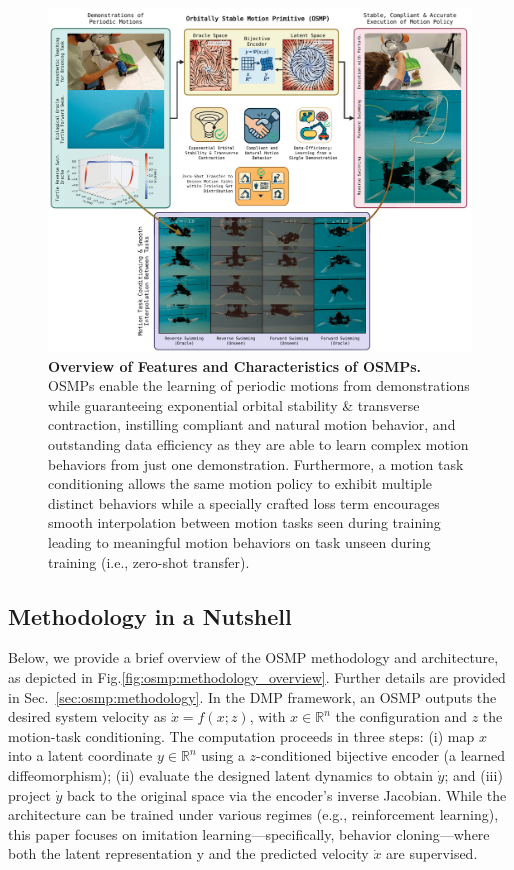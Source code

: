 \begin{figure}[h!]
    \centering
    \includegraphics[width=1.0\linewidth]{osmp/figures/concept_overview/concept_overview_v1_compressed.pdf}
    \caption{
    \textbf{Overview of Features and Characteristics of \glspl{OSMP}.}
    OSMPs enable the learning of periodic motions from demonstrations while guaranteeing exponential orbital stability \& transverse contraction, instilling compliant and natural motion behavior, and outstanding data efficiency as they are able to learn complex motion behaviors from just one demonstration. Furthermore, a motion task conditioning allows the same motion policy to exhibit multiple distinct behaviors while a specially crafted loss term encourages smooth interpolation between motion tasks seen during training leading to meaningful motion behaviors on task unseen during training (i.e., zero-shot transfer).
    }
    \label{fig:osmp:concept_overview}
\end{figure}


\subsection{Methodology in a Nutshell}
Below, we provide a brief overview of the \gls{OSMP} methodology and architecture, as depicted in Fig.\ref{fig:osmp:methodology_overview}. Further details are provided in Sec.~\ref{sec:osmp:methodology}. In the \gls{DMP} framework, an \gls{OSMP} outputs the desired system velocity as $\dot{x}=f(x; z)$, with $x\in\mathbb{R}^n$ the configuration and $z$ the motion-task conditioning. The computation proceeds in three steps: (i) map $x$ into a latent coordinate $y\in\mathbb{R}^n$ using a $z$-conditioned bijective encoder (a learned diffeomorphism); (ii) evaluate the designed latent dynamics to obtain $\dot{y}$; and (iii) project $\dot{y}$ back to the original space via the encoder’s inverse Jacobian. While the architecture can be trained under various regimes (e.g., reinforcement learning), this paper focuses on imitation learning—specifically, behavior cloning—where both the latent representation y and the predicted velocity $\dot{x}$ are supervised.

